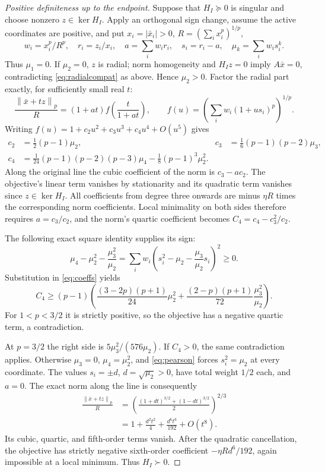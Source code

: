 \documentclass[11pt]{article}
\newcommand{\norm}[1]{\left\lVert#1\right\rVert}
\theoremstyle{remark}\newtheorem{remark}[theorem]{Remark}
\begin{document}
\begin{proof}[Positive definiteness up to the endpoint]
Suppose that $H_I\succeq0$ is singular and choose nonzero
$z\in\ker H_I$. Apply an orthogonal sign change, assume the active coordinates are positive, and put
$x_i=|\bar x_i|>0$, $R=(\sum_i x_i^p)^{1/p}$,
\[
 w_i=x_i^p/R^p,\quad r_i=z_i/x_i,\quad
 a=\sum_iw_i r_i,\quad s_i=r_i-a,\quad
 \mu_k=\sum_iw_i s_i^k.
\]
Thus $\mu_1=0$. If $\mu_2=0$, $z$ is radial; norm homogeneity and
$H_Iz=0$ imply $A\bar x=0$, contradicting
\eqref{eq:radialcompat} as above. Hence $\mu_2>0$.
Factor the radial part exactly, for sufficiently small real $t$:
\[
 \frac{\norm{\bar x+tz}_p}{R}
 =(1+at)f\left(\frac{t}{1+at}\right),\qquad
 f(u)=\left(\sum_iw_i(1+us_i)^p\right)^{1/p}.
\]
Writing $f(u)=1+c_2u^2+c_3u^3+c_4u^4+O(u^5)$ gives
\begin{align}\label{eq:coeffs}
 c_2&=\tfrac12(p-1)\mu_2,&
 c_3&=\tfrac16(p-1)(p-2)\mu_3,\nonumber\\
 c_4&=\tfrac1{24}(p-1)(p-2)(p-3)\mu_4
                         -\tfrac18(p-1)^3\mu_2^2.
\end{align}
Along the original line the cubic coefficient of the norm is
$c_3-ac_2$. The objective's linear term vanishes by stationarity and
its quadratic term vanishes since $z\in\ker H_I$. All coefficients
from degree three onwards are minus $\eta R$ times the corresponding
norm coefficients. Local minimality on both sides therefore requires
$a=c_3/c_2$, and the norm's quartic coefficient becomes
$C_4=c_4-c_3^2/c_2$.

The following exact square identity supplies its sign:
\begin{equation}\label{eq:pearson}
 \mu_4-\mu_2^2-\frac{\mu_3^2}{\mu_2}
 =\sum_iw_i\left(s_i^2-\mu_2-\frac{\mu_3}{\mu_2}s_i\right)^2\ge0.
\end{equation}
Substitution in \eqref{eq:coeffs} yields
\begin{equation}\label{eq:C4}
 C_4\ge(p-1)\left(
 \frac{(3-2p)(p+1)}{24}\mu_2^2+
 \frac{(2-p)(p+1)}{72}\frac{\mu_3^2}{\mu_2}\right).
\end{equation}
For $1<p<3/2$ it is strictly positive, so the objective has a negative
quartic term, a contradiction.

At $p=3/2$ the right side is $5\mu_3^2/(576\mu_2)$.
If $C_4>0$, the same contradiction applies. Otherwise
$\mu_3=0$, $\mu_4=\mu_2^2$, and \eqref{eq:pearson} forces
$s_i^2=\mu_2$ at every coordinate. The values $s_i=\pm d$,
$d=\sqrt{\mu_2}>0$, have total weight $1/2$ each, and $a=0$.
The exact norm along the line is consequently
\begin{align}\label{eq:endpoint}
 \frac{\norm{\bar x+tz}_p}{R}
 &=\left(\frac{(1+dt)^{3/2}+(1-dt)^{3/2}}2\right)^{2/3}\nonumber\\
 &=1+\frac{d^2t^2}4+\frac{d^6t^6}{192}+O(t^8).
\end{align}
Its cubic, quartic, and fifth-order terms vanish. After the quadratic
cancellation, the objective has strictly negative sixth-order coefficient
$-\eta R d^6/192$, again impossible at a local minimum. Thus $H_I\succ0$.
\end{proof}
\end{document}

